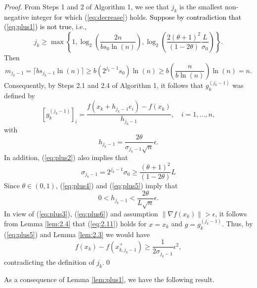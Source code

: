 \begin{proof}
From Steps 1 and 2 of Algorithm 1, we see that $j_{k}$ is the smallest non-negative integer for which (\ref{eq:decrease}) holds. \textcolor{black}{Suppose by contradiction that (\ref{eq:plus1}) is not true}, i.e.,
\begin{equation}
j_{k}\geq \max\left\{1,\log_{2}\left(\dfrac{2n}{bs_{0}\ln(n)}\right),\log_{2}\left(\dfrac{2(\theta+1)^{2}}{(1-2\theta)}\dfrac{L}{\sigma_{0}}\right)\right\}.
\label{eq:plus2}
\end{equation}
Then
\begin{equation*}
m_{j_{k}-1}=\lceil{b s_{j_{k}-1}\ln(n)\rceil}\geq b\left(2^{j_{k}-1}s_{0}\right)\ln(n)\geq b\left(\dfrac{n}{b\ln(n)}\right)\ln(n)=n.
\end{equation*}
Consequently, by Steps 2.1 and 2.4 of Algorithm 1, it follows that $g_{k}^{(j_{k}-1)}$ was defined by
\begin{equation}
\left[g_{k}^{(j_{k}-1)}\right]_{i}=\dfrac{f(x_{k}+h_{j_{k}-1}e_{i})-f(x_{k})}{h_{j_{k}-1}},\quad i=1,\ldots,n,
\label{eq:plus3}
\end{equation}
with
\begin{equation}
h_{j_{k}-1}=\dfrac{2\theta}{\sigma_{j_{k}-1}\sqrt{n}}\epsilon.
\label{eq:plus4}
\end{equation}
In addition, (\ref{eq:plus2}) also implies that
\begin{equation}
\sigma_{j_{k}-1}=2^{j_{k}-1}\sigma_{0}\geq\dfrac{(\theta+1)^{2}}{(1-2\theta)}L
\label{eq:plus5}
\end{equation}
Since $\theta\in (0,1)$, (\ref{eq:plus4}) and (\ref{eq:plus5}) imply that
\begin{equation}
0<h_{j_{k}-1}<\dfrac{2\theta}{L\sqrt{n}}\epsilon.
\label{eq:plus6}
\end{equation}
In view of (\ref{eq:plus3}), (\ref{eq:plus6}) and assumption $\|\nabla f(x_{k})\|>\epsilon$, it follows from Lemma \ref{lem:2.4} that (\ref{eq:2.11}) holds for $x=x_{k}$ and $g=g_{k}^{(j_{k}-1)}$. Thus, by (\ref{eq:plus5}) and Lemma \ref{lem:2.3} we would have 
\begin{equation*}
f(x_{k})-f(x_{k,j_{k}-1}^{+})\geq\dfrac{1}{2\sigma_{j_{k}-1}}\epsilon^{2},
\end{equation*}
contradicting the definition of $j_{k}$.\qed
\end{proof}
As a consequence of Lemma \ref{lem:plus1}, we have the following result.

